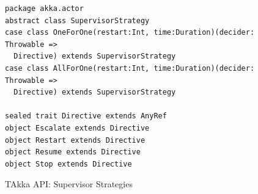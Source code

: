 \begin{figure}[h]
    \begin{lstlisting}    
package akka.actor
abstract class SupervisorStrategy
case class OneForOne(restart:Int, time:Duration)(decider: Throwable => 
  Directive) extends SupervisorStrategy
case class AllForOne(restart:Int, time:Duration)(decider: Throwable => 
  Directive) extends SupervisorStrategy

sealed trait Directive extends AnyRef
object Escalate extends Directive
object Restart extends Directive
object Resume extends Directive
object Stop extends Directive
    \end{lstlisting}
    \caption{TAkka API: Supervisor Strategies}
    \label{takka_supervisor_strategy}
\end{figure}

